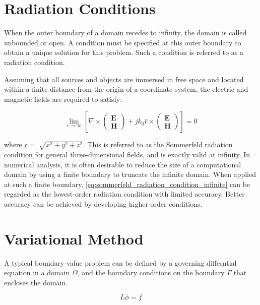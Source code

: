 \documentclass[a4paper,12pt]{report}
\begin{document}
\section{Radiation Conditions}

When the outer boundary of a domain recedes to infinity,
the domain is called unbounded or open.
A condition must be specified at this outer boundary to obtain a unique solution
for this problem.
Such a condition is referred to as a radiation condition.

Assuming that all sources and objects are immersed in free space
and located within a finite distance from the origin of a coordinate system,
the electric and magnetic fields are required to satisfy:

\begin{equation} \label{eq:sommerfeld_radiation_condition_infinite}
  \lim_{r \to \infty}\left[\nabla\times\begin{pmatrix}
    \boldsymbol{E} \\
    \boldsymbol{H}
  \end{pmatrix} + jk_0\hat{r} \times\begin{pmatrix}
    \boldsymbol{E} \\
    \boldsymbol{H}
  \end{pmatrix}\right] = 0
\end{equation}

where $r = \sqrt[]{x^2 + y^2 + z ^2}$.
This is referred to as the Sommerfeld radiation condition for general three-dimensional fields,
and is exactly valid at infinity.
In numerical analysis,
it is often desirable to reduce the size of a computational domain
by using a finite boundary to truncate the infinite domain.
When applied at such a finite boundary,
\ref{eq:sommerfeld_radiation_condition_infinite} can be regarded as the
lowest-order radiation condition with limited accuracy.
Better accuracy can be achieved by developing higher-order conditions.

\section{Variational Method}

A typical boundary-value problem can be defined by a
governing differntial equation in a domain $\Omega$,
and the boundary conditions on the boundary $\Gamma$ that encloses the domain.

\begin{equation} \label{eq:general_boundary_value_problem}
  L\phi = f
\end{equation}
\end{document}
